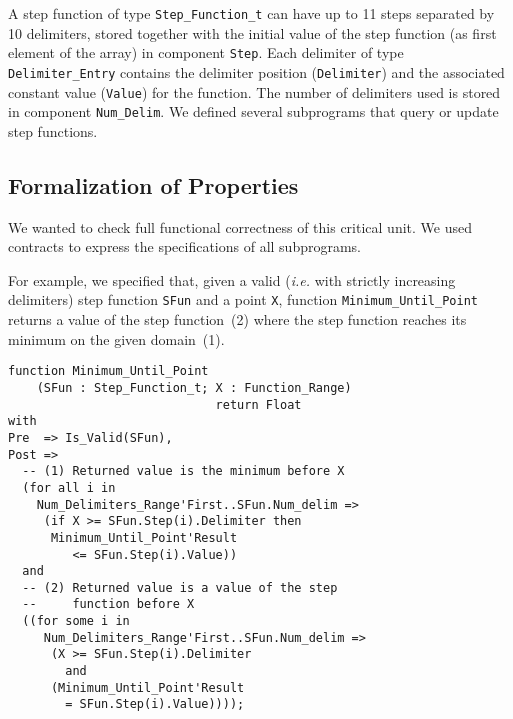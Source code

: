 \documentclass[10pt,a4paper,twocolumn]{article}
\newcommand{\ie}{\textit{i.e.}\xspace}
\begin{document}
A step function of type \verb|Step_Function_t| can have up to 11 steps
separated by 10 delimiters, stored together with the initial value of
the step function (as first element of the array) in component
\verb|Step|. Each delimiter of type \verb|Delimiter_Entry| contains
the delimiter position (\verb|Delimiter|) and the associated constant
value (\verb|Value|) for the function. The number of delimiters used
is stored in component \verb|Num_Delim|. We defined several
subprograms that query or update step functions.

\subsection{Formalization of Properties}

We wanted to check full functional correctness of this critical
unit. We used contracts to express the specifications of all
subprograms.

For example, we specified that, given a valid (\ie with strictly
increasing delimiters) step function \verb|SFun| and a point \verb|X|,
function \verb|Minimum_Until_Point| returns a value of the step
function~(2) where the step function reaches its minimum on the given
domain~(1).

\begin{lstlisting}
function Minimum_Until_Point
    (SFun : Step_Function_t; X : Function_Range)
                             return Float
with
Pre  => Is_Valid(SFun),
Post =>
  -- (1) Returned value is the minimum before X
  (for all i in
    Num_Delimiters_Range'First..SFun.Num_delim =>
     (if X >= SFun.Step(i).Delimiter then
      Minimum_Until_Point'Result
         <= SFun.Step(i).Value))
  and
  -- (2) Returned value is a value of the step
  --     function before X
  ((for some i in
     Num_Delimiters_Range'First..SFun.Num_delim =>
      (X >= SFun.Step(i).Delimiter
        and
      (Minimum_Until_Point'Result
        = SFun.Step(i).Value))));
\end{lstlisting}
\end{document}
